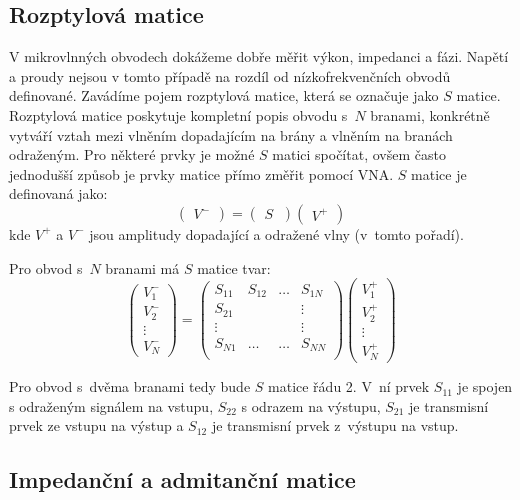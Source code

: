 \documentclass{protokol}
\begin{document}
\subsection{Rozptylová matice}

V mikrovlnných obvodech dokážeme dobře měřit výkon, impedanci a fázi. 
Napětí a proudy nejsou v tomto případě na rozdíl od nízkofrekvenčních obvodů definované. 
Zavádíme pojem rozptylová matice, která se označuje
jako $S$ matice.
Rozptylová matice poskytuje kompletní popis obvodu s~$N$ branami,
konkrétně vytváří vztah mezi vlněním dopadajícím na brány
a vlněním na branách odraženým.
Pro některé prvky je možné $S$ matici spočítat,
ovšem často jednodušší způsob je prvky matice přímo změřit pomocí VNA.
$S$ matice je definovaná jako:
\[
\begin{pmatrix}
	V^-
\end{pmatrix}
=
\begin{pmatrix}
	S~\end{pmatrix}
%
\begin{pmatrix}
	V^+
\end{pmatrix}
\]
kde $V^+$ a $V^-$ jsou amplitudy dopadající a odražené vlny
(v~tomto pořadí).

Pro obvod s~$N$ branami má $S$ matice tvar:
\[
\begin{pmatrix}
	V_1^-     \\
	V_2^-		\\
	\vdots	\\
	V_N^-
\end{pmatrix}
=
\begin{pmatrix}
	S_{11} & S_{12} & \dots & S_{1N}   \\
	S_{21} &		& 		& \vdots	\\
	\vdots &		& 		& \vdots	\\
	S_{N1} & \dots	& \dots & S_{NN} 	\\
\end{pmatrix}
%
\begin{pmatrix}
	V_1^+     \\
	V_2^+		\\
	\vdots	\\
	V_N^+
\end{pmatrix}
\]

Pro obvod s~dvěma branami tedy bude $S$ matice řádu 2.
V~ní prvek $S_{11}$ je spojen s odraženým signálem na vstupu,
$S_{22}$ s odrazem na výstupu, $S_{21}$ je transmisní prvek ze vstupu na výstup
a $S_{12}$ je transmisní prvek z~výstupu na vstup.

\subsection{Impedanční a admitanční matice}
\end{document}
